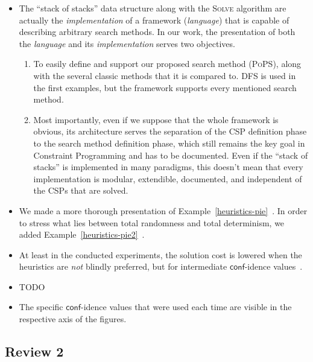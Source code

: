 \documentclass{ws-ijait}
\begin{document}
\begin{itemize}
  \item The ``stack of stacks'' data structure along with
        the \textsc{Solve} algorithm are actually the
        \emph{implementation} of a framework
        (\emph{language}) that is capable of describing
        arbitrary search methods. In our work, the
        presentation of both the \emph{language} and its
        \emph{implementation} serves two objectives.
        \begin{enumerate}
          \item To easily define and support our proposed
                search method (\textsc{PoPS}), along with
                the several classic methods that it is
                compared to. DFS is used in the first
                examples, but the framework supports every
                mentioned search method.
          \item Most importantly, even if we suppose that
                the whole framework is obvious, its
                architecture serves the separation of the
                CSP definition phase to the search method
                definition phase, which still remains the
                key goal in Constraint
                Programming\cite{Freuder2014} and has to be
                documented. Even if the ``stack of stacks''
                is implemented in many paradigms, this
                doesn't mean that every implementation is
                modular, extendible, documented, and
                independent of the CSPs that are solved.
          \end{enumerate}
  \item We made a more thorough presentation of
        Example~\ref{heuristics-pie}~. In order
        to stress what lies between total randomness and
        total determinism, we added
        Example~\ref{heuristics-pie2}~.
  \item At least in the conducted experiments, the solution
        cost is lowered when the heuristics are \emph{not}
        blindly preferred, but for intermediate
        $\mathsf{conf}$-idence values~.
  \item TODO
  \item The specific $\mathsf{conf}$-idence values that were
        used each time are visible in the respective axis
        of the figures.
\end{itemize}

\subsection*{Review 2}
\end{document}
